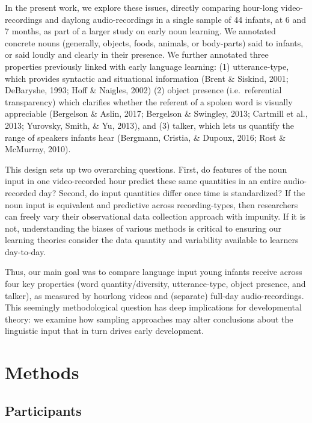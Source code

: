 \documentclass[floatsintext,man]{apa6}
\theoremstyle{definition}
\theoremstyle{definition}
\theoremstyle{definition}
\theoremstyle{remark}
\begin{document}
In the present work, we explore these issues, directly comparing
hour-long video-recordings and daylong audio-recordings in a single
sample of 44 infants, at 6 and 7 months, as part of a larger study on
early noun learning. We annotated concrete nouns (generally, objects,
foods, animals, or body-parts) said to infants, or said loudly and
clearly in their presence. We further annotated three properties
previously linked with early language learning: (1) utterance-type,
which provides syntactic and situational information (Brent \& Siskind,
2001; DeBaryshe, 1993; Hoff \& Naigles, 2002) (2) object presence
(i.e.~referential transparency) which clarifies whether the referent of
a spoken word is visually appreciable (Bergelson \& Aslin, 2017;
Bergelson \& Swingley, 2013; Cartmill et al., 2013; Yurovsky, Smith, \&
Yu, 2013), and (3) talker, which lets us quantify the range of speakers
infants hear (Bergmann, Cristia, \& Dupoux, 2016; Rost \& McMurray,
2010).

This design sets up two overarching questions. First, do features of the
noun input in one video-recorded hour predict these same quantities in
an entire audio-recorded day? Second, do input quantities differ once
time is standardized? If the noun input is equivalent and predictive
across recording-types, then researchers can freely vary their
observational data collection approach with impunity. If it is not,
understanding the biases of various methods is critical to ensuring our
learning theories consider the data quantity and variability available
to learners day-to-day.

Thus, our main goal was to compare language input young infants receive
across four key properties (word quantity/diversity, utterance-type,
object presence, and talker), as measured by hourlong videos and
(separate) full-day audio-recordings. This seemingly methodological
question has deep implications for developmental theory: we examine how
sampling approaches may alter conclusions about the linguistic input
that in turn drives early development.

\section{Methods}\label{methods}

\subsection{Participants}\label{participants}
\end{document}
